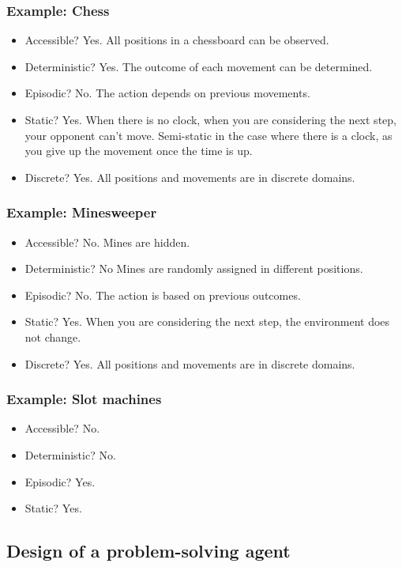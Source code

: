 \documentclass[11pt]{article}
\begin{document}
\subsubsection{Example: Chess}
\label{sec:orge5beffa}
\begin{itemize}
\item Accessible? Yes. All positions in a chessboard can be observed.
\item Deterministic? Yes. The outcome of each movement can be determined.
\item Episodic? No. The action depends on previous movements.
\item Static? Yes. When there is no clock, when you are considering the next step, your opponent can't move. Semi-static in the case where there is a clock, as you give up the movement once the time is up.
\item Discrete? Yes. All positions and movements are in discrete domains.
\end{itemize}
\subsubsection{Example: Minesweeper}
\label{sec:org2960ec5}
\begin{itemize}
\item Accessible? No. Mines are hidden.
\item Deterministic? No Mines are randomly assigned in different positions.
\item Episodic? No. The action is based on previous outcomes.
\item Static? Yes. When you are considering the next step, the environment does not change.
\item Discrete? Yes. All positions and movements are in discrete domains.
\end{itemize}
\subsubsection{Example: Slot machines}
\label{sec:org922d6eb}
\begin{itemize}
\item Accessible? No.
\item Deterministic? No.
\item Episodic? Yes.
\item Static? Yes.
\end{itemize}
\subsection{Design of a problem-solving agent}
\label{sec:org1bffdcc}
\end{document}

